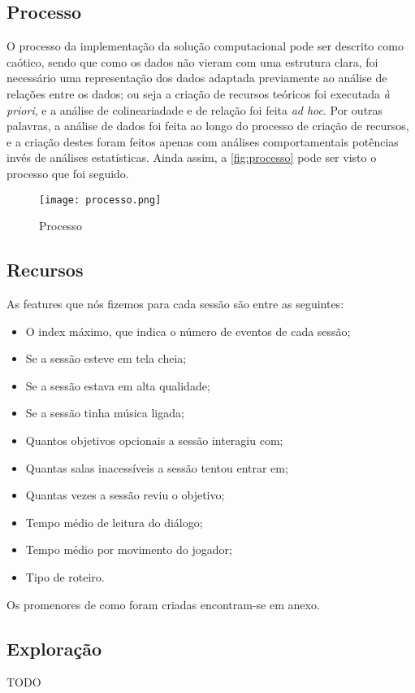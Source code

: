 \documentclass[justified, 11pt]{scrartcl}
\begin{document}
  \subsection{Processo}
  O processo da implementação da solução computacional pode ser descrito como caótico, sendo que como os dados não vieram com uma estrutura clara, foi necessário uma representação dos dados adaptada previamente ao análise de relações entre os dados; ou seja a criação de recursos teóricos foi executada \textit{à priori}, e a análise de colineariadade e de relação foi feita \textit{ad hoc}. Por outras palavras, a análise de dados foi feita ao longo do processo de criação de recursos, e a criação destes foram feitos apenas com análises comportamentais potências invés de análises estatísticas. Ainda assim, a \autoref{fig:processo} pode ser visto o processo que foi seguido.

  \begin{figure}[H]
    \centering
    \texttt{[image: processo.png]}
    \caption{Processo}
    \label{fig:processo}
  \end{figure}
  
  \subsection{Recursos}
  As features que nós fizemos para cada sessão são entre as seguintes:
  \begin{itemize}
    \item O index máximo, que indica o número de eventos de cada sessão;
    \item Se a sessão esteve em tela cheia;
    \item Se a sessão estava em alta qualidade;
    \item Se a sessão tinha música ligada;
    \item Quantos objetivos opcionais a sessão interagiu com;
    \item Quantas salas inacessíveis a sessão tentou entrar em;
    \item Quantas vezes a sessão reviu o objetivo;
    \item Tempo médio de leitura do diálogo;
    \item Tempo médio por movimento do jogador;
    \item Tipo de roteiro.
  \end{itemize}

  Os promenores de como foram criadas encontram-se em anexo.

  \subsection{Exploração}
  TODO
  
\end{document}
